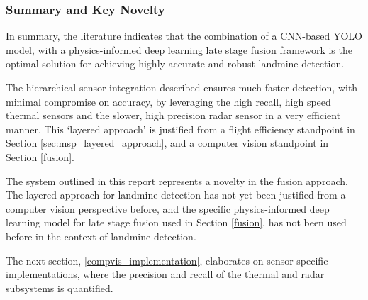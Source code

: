     
    \subsubsection{Summary and Key Novelty}


    
        \noindent In summary, the literature indicates that the combination of a CNN-based YOLO model, with a physics-informed deep learning late stage fusion framework is the optimal solution for achieving highly accurate and robust landmine detection.

        \noindent The hierarchical sensor integration described ensures much faster detection, with minimal compromise on accuracy, by leveraging the high recall, high speed thermal sensors and the slower, high precision radar sensor in a very efficient manner. This `layered approach' is justified from a flight efficiency standpoint in Section \ref{sec:msp_layered_approach}, and a computer vision standpoint in Section \ref{fusion}.
            
        \noindent The system outlined in this report represents a novelty in the fusion approach. The layered approach for landmine detection has not yet been justified from a computer vision perspective before, and the specific physics-informed deep learning model for late stage fusion used in Section \ref{fusion}, has not been used before in the context of landmine detection.

        The next section, \ref{compvis_implementation}, elaborates on sensor-specific implementations, where the precision and recall of the thermal and radar subsystems is quantified.


            
    
    
